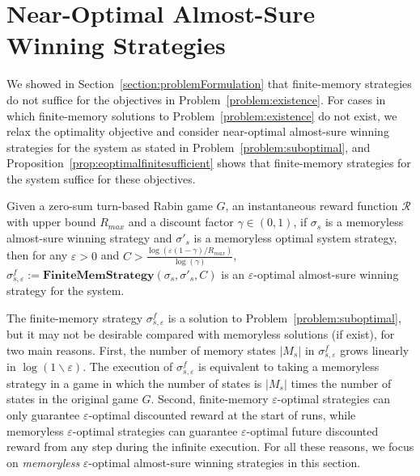 \documentclass[runningheads,a4paper]{llncs}
\begin{document}
\section{Near-Optimal Almost-Sure Winning Strategies}
\label{section:nearoptimal}





We showed in Section~\ref{section:problemFormulation} that finite-memory strategies do not suffice for the objectives in Problem~\ref{problem:existence}. For cases in which finite-memory solutions to Problem~\ref{problem:existence} do not exist, we relax the optimality objective and consider near-optimal almost-sure winning strategies for the system as stated in Problem~\ref{problem:suboptimal}, and Proposition~\ref{prop:eoptimalfinitesufficient} shows that finite-memory strategies for the system suffice for these objectives. 

\begin{proposition}
Given a zero-sum turn-based Rabin game $G$, an instantaneous reward function $\mathcal{R}$ with upper bound $R_{max}$ and a discount factor $\gamma \in (0,1)$, if $\sigma_s$ is a memoryless almost-sure winning strategy and $\sigma'_s$ is a memoryless optimal system strategy, then for any $\varepsilon > 0$ and $C > \frac{\log(\varepsilon (1-\gamma) / R_{max})}{\log(\gamma)}$, $\sigma_{s, \varepsilon}^f := \textbf{FiniteMemStrategy}(\sigma_s, \sigma'_s, C)$ is an $\varepsilon$-optimal almost-sure winning strategy for the system. 
\label{prop:eoptimalfinitesufficient}
\end{proposition}

The finite-memory strategy $\sigma_{s, \varepsilon}^f$ is a solution to Problem~\ref{problem:suboptimal}, but it may not be desirable compared with memoryless solutions (if exist), for two main reasons.
First, the number of memory states $|M_s|$ in $\sigma_{s, \varepsilon}^f$ grows linearly in $\log (1 \backslash \varepsilon)$. 
The execution of $\sigma_{s, \varepsilon}^f$ is equivalent to taking a memoryless strategy in a game in which the number of states is $|M_s|$ times the number of states in the original game $G$. Second, finite-memory $\varepsilon$-optimal strategies can only guarantee $\varepsilon$-optimal discounted reward at the start of runs, while memoryless $\varepsilon$-optimal strategies can guarantee $\varepsilon$-optimal future discounted reward from any step during the infinite execution. For all these reasons, we focus on \emph{memoryless} $\varepsilon$-optimal almost-sure winning strategies in this section. 
\end{document}
